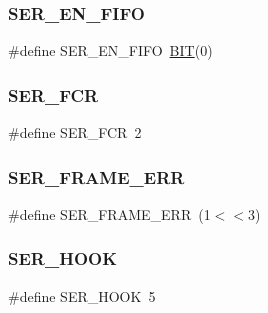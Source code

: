 \subsubsection{\texorpdfstring{S\+E\+R\+\_\+\+E\+N\+\_\+\+F\+I\+FO}{SER\_EN\_FIFO}}
{\footnotesize\ttfamily \#define S\+E\+R\+\_\+\+E\+N\+\_\+\+F\+I\+FO~\hyperlink{video__gr_8c_a3a8ea58898cb58fc96013383d39f482c}{B\+IT}(0)}

\hypertarget{group__ser__port_ga9261eef6859842b51e42894b61c5b1c0}{}\label{group__ser__port_ga9261eef6859842b51e42894b61c5b1c0} 
\subsubsection{\texorpdfstring{S\+E\+R\+\_\+\+F\+CR}{SER\_FCR}}
{\footnotesize\ttfamily \#define S\+E\+R\+\_\+\+F\+CR~2}

\hypertarget{group__ser__port_ga0182fcdfbfeb90906d60c3ddb411aece}{}\label{group__ser__port_ga0182fcdfbfeb90906d60c3ddb411aece} 
\subsubsection{\texorpdfstring{S\+E\+R\+\_\+\+F\+R\+A\+M\+E\+\_\+\+E\+RR}{SER\_FRAME\_ERR}}
{\footnotesize\ttfamily \#define S\+E\+R\+\_\+\+F\+R\+A\+M\+E\+\_\+\+E\+RR~(1$<$$<$3)}

\hypertarget{group__ser__port_ga673bc80505f70c750fe685caf9a0d6b0}{}\label{group__ser__port_ga673bc80505f70c750fe685caf9a0d6b0} 
\subsubsection{\texorpdfstring{S\+E\+R\+\_\+\+H\+O\+OK}{SER\_HOOK}}
{\footnotesize\ttfamily \#define S\+E\+R\+\_\+\+H\+O\+OK~5}

\hypertarget{group__ser__port_ga783f8e3973a5f87d8af120d49742f834}{}\label{group__ser__port_ga783f8e3973a5f87d8af120d49742f834} 
